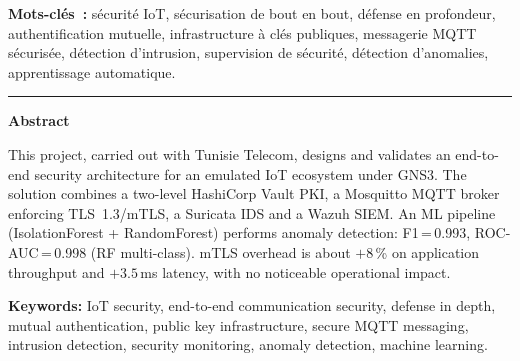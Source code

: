\smallskip
\noindent\textbf{Mots-clés~:} sécurité IoT, sécurisation de bout en bout, défense en profondeur, authentification mutuelle, infrastructure à clés publiques, messagerie MQTT sécurisée, détection d'intrusion, supervision de sécurité, détection d'anomalies, apprentissage automatique.

\vspace{4pt}\noindent\rule{\linewidth}{0.4pt}\vspace{4pt}

\begin{center}
  \textbf{\normalsize Abstract}
\end{center}
\noindent This project, carried out with Tunisie Telecom, designs and validates an end-to-end security architecture for an
emulated IoT ecosystem under GNS3. The solution combines a two-level HashiCorp Vault PKI, a Mosquitto MQTT
broker enforcing TLS~1.3/mTLS, a Suricata IDS and a Wazuh SIEM. An ML pipeline (IsolationForest + RandomForest)
performs anomaly detection: F1\,=\,0.993, ROC-AUC\,=\,0.998 (RF multi-class). mTLS overhead is about \(+8\)\,\% on application
throughput and \(+3.5\)\,ms latency, with no noticeable operational impact.

\smallskip
\noindent\textbf{Keywords:} IoT security, end-to-end communication security, defense in depth, mutual authentication, public key infrastructure, secure MQTT messaging, intrusion detection, security monitoring, anomaly detection, machine learning.

\endgroup
